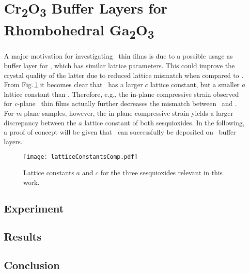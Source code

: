 \section{\texorpdfstring{C\lowercase{r}\textsubscript{2}O\textsubscript{3}}{Cr2O3} Buffer Layers for Rhombohedral \texorpdfstring{G\lowercase{a}\textsubscript{2}O\textsubscript{3}}{a-Ga2O3}}
    \label{Sec:Results_Buffer}

A major motivation for investigating \cro\ thin films is due to a possible usage as buffer layer for \agao, which has similar lattice parameters.
This could improve the crystal quality of the latter due to reduced lattice mismatch when compared to 
    \cite{stepanov2021}.
From Fig.\,\ref{Fig:Results_4_LatticeConstantsComp} it becomes clear that \cro\ has a larger $c$ lattice constant, but a smaller $a$ lattice constant than \agao.
Therefore, e.g., the in-plane compressive strain observed for \textit{c}-plane \cro\ thin films actually further decreases the mismatch between \cro\ and \agao.
For \textit{m}-plane samples, however, the in-plane compressive strain yields a larger discrepancy between the $a$ lattice constant of both sesquioxides.
In the following, a proof of concept will be given that \agao\ can successfully be deposited on \cro\ buffer layers.
\begin{figure}[b]
    \centering
    \texttt{[image: latticeConstantsComp.pdf]}
    \caption{Lattice constants $a$ and $c$ for the three sesquioxides relevant in this work.}
    \label{Fig:Results_4_LatticeConstantsComp}
\end{figure}

\subsection{Experiment}
    
\subsection{Results}
    
\subsection{Conclusion}
    